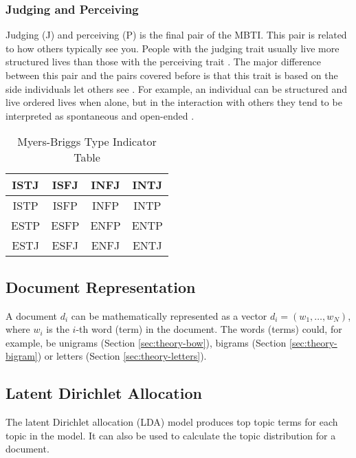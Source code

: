 \subsubsection{Judging and Perceiving}
Judging (J) and perceiving (P) is the final pair of the MBTI.
This pair is related to how others typically see you.
People with the judging trait usually live more structured lives than those with the perceiving trait \cite{mbti-JP}.
The major difference between this pair and the pairs covered before is that this trait is based on the side individuals let others see \cite{mbti-JP}.
For example, an individual can be structured and live ordered lives when alone, but in the interaction with others they tend to be interpreted as spontaneous and open-ended \cite{mbti-JP}.

\begin{table}[!t]
    \renewcommand{\arraystretch}{3}
    \caption{Myers-Briggs Type Indicator Table}
    \label{tab:mbti-types}
    \centering
    \begin{tabular}{|c|c|c|c|}
        \hline
        ISTJ & ISFJ & INFJ & INTJ \\
        \hline
        ISTP & ISFP & INFP & INTP \\
        \hline
        ESTP & ESFP & ENFP & ENTP \\
        \hline
        ESTJ & ESFJ & ENFJ & ENTJ \\
        \hline
    \end{tabular}
\end{table}

\subsection{Document Representation}
A document $d_i$ can be mathematically represented as a vector $d_i = (w_1, \ldots, w_N)$, where $w_i$ is the $i$-th word (term) in the document.
The words (terms) could, for example, be unigrams (Section \ref{sec:theory-bow}), bigrams (Section \ref{sec:theory-bigram}) or letters (Section \ref{sec:theory-letters}).

\subsection{Latent Dirichlet Allocation}
The latent Dirichlet allocation (LDA) model produces top topic terms for each topic in the model.
It can also be used to calculate the topic distribution for a document.

